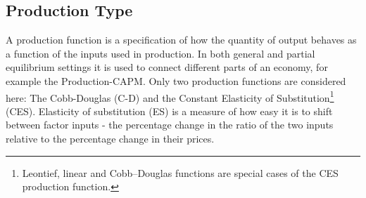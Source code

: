 \documentclass[11pt]{article}
\begin{document}
\subsection{Production Type}
A production function is a specification of how the quantity of output behaves as a function of the inputs used in production.  In both general and partial equilibrium settings it is used to connect different parts of an economy, for example the Production-CAPM\autocite{cochrane91}.  Only two production functions are considered here: The Cobb-Douglas (C-D) and the Constant Elasticity of Substitution\footnote{Leontief, linear and Cobb–Douglas functions are special cases of the CES production function.} (CES).  Elasticity of substitution (ES) is a measure of how easy it is to shift between factor inputs - the percentage change in the ratio of the two inputs relative to the percentage change in their prices.
\end{document}
